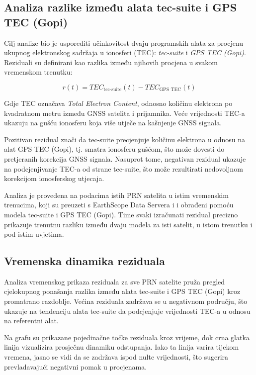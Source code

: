 \documentclass[
]{article}
\begin{document}
\subsection{Analiza razlike između alata tec-suite i GPS TEC
(Gopi)}\label{analiza-razlike-izmeux111u-alata-tec-suite-i-gps-tec-gopi}

Cilj analize bio je usporediti učinkovitost dvaju programskih alata za
procjenu ukupnog elektronskog sadržaja u ionosferi (TEC):
\emph{tec-suite} i \emph{GPS TEC (Gopi)}. Reziduali su definirani kao
razlika između njihovih procjena u svakom vremenskom trenutku:

\[
r(t) = TEC_{\text{tec-suite}}(t) - TEC_{\text{GPS TEC}}(t)
\]

Gdje TEC označava \emph{Total Electron Content}, odnosno količinu
elektrona po kvadratnom metru između GNSS satelita i prijamnika. Veće
vrijednosti TEC-a ukazuju na gušću ionosferu koja više utječe na
kašnjenje GNSS signala.

Pozitivan rezidual znači da tec-suite precjenjuje količinu elektrona u
odnosu na alat GPS TEC (Gopi), tj. smatra ionosferu gušćom, što može
dovesti do pretjeranih korekcija GNSS signala. Nasuprot tome, negativan
rezidual ukazuje na podcjenjivanje TEC-a od strane tec-suite, što može
rezultirati nedovoljnom korekcijom ionosferskog utjecaja.

Analiza je provedena na podacima istih PRN satelita u istim vremenskim
trenucima, koji su preuzeti s EarthScope Data Servera i i obrađeni
pomoću modela tec-suite i GPS TEC (Gopi). Time svaki izračunati rezidual
precizno prikazuje trenutnu razliku između dvaju modela za isti satelit,
u istom trenutku i pod istim uvjetima.

\subsection{Vremenska dinamika
reziduala}\label{vremenska-dinamika-reziduala}

Analiza vremenskog prikaza reziduala za sve PRN satelite pruža pregled
cjelokupnog ponašanja razlika između alata tec-suite i GPS TEC (Gopi)
kroz promatrano razdoblje. Većina reziduala zadržava se u negativnom
području, što ukazuje na tendenciju alata tec-suite da podcjenjuje
vrijednosti TEC-a u odnosu na referentni alat.

Na grafu su prikazane pojedinačne točke reziduala kroz vrijeme, dok crna
glatka linija vizualizira prosječnu dinamiku odstupanja. Iako ta linija
varira tijekom vremena, jasno se vidi da se zadržava ispod nulte
vrijednosti, što sugerira prevladavajući negativni pomak u procjenama.
\end{document}
